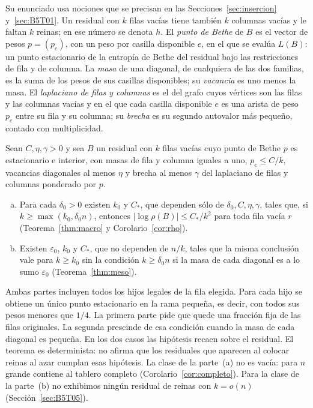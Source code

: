 Su enunciado usa nociones que se precisan en las Secciones~\ref{sec:insercion} y~\ref{sec:B5T01}.
Un residual con $k$ filas vacías tiene también $k$ columnas vacías y le faltan $k$ reinas; en
\cite{Completabilidad} ese número se denota $h$.
El \emph{punto de Bethe} de $B$ es el vector de pesos $p=(p_e)$, con un peso por casilla disponible
$e$, en el que se evalúa $L(B)$: un punto estacionario de la entropía de Bethe del residual bajo las
restricciones de fila y de columna. La \emph{masa} de una diagonal, de cualquiera de las dos
familias, es la suma de los pesos de sus casillas disponibles; su \emph{vacancia} es uno menos la
masa. El \emph{laplaciano de filas y columnas} es el del grafo cuyos vértices son las filas y las
columnas vacías y en el que cada casilla disponible $e$ es una arista de peso $p_e$ entre su fila y
su columna; su \emph{brecha} es su segundo autovalor más pequeño, contado con multiplicidad.

\begin{teorema}\label{thm:intro-consistencia}
Sean $C,\eta,\gamma>0$ y sea $B$ un residual con $k$ filas vacías cuyo punto de Bethe $p$ es
estacionario e interior, con masas de fila y columna iguales a uno, $p_e\le C/k$, vacancias diagonales
al menos $\eta$ y brecha al menos $\gamma$ del laplaciano de filas y columnas ponderado por $p$.
\begin{enumerate}[(a)]
\item Para cada $\delta_0>0$ existen $k_0$ y $C_*$, que dependen sólo de $\delta_0,C,\eta,\gamma$, tales
que, si $k\ge\max(k_0,\delta_0n)$, entonces $|\log\rho(B)|\le C_*/k^2$ para toda fila vacía $r$
(Teorema~\ref{thm:macro} y Corolario~\ref{cor:rho}).
\item Existen $\varepsilon_0$, $k_0$ y $C_*$, que no dependen de $n/k$, tales que la misma conclusión
vale para $k\ge k_0$ sin la condición $k\ge\delta_0n$ si la masa de cada diagonal es a lo sumo
$\varepsilon_0$ (Teorema~\ref{thm:meso}).
\end{enumerate}
\end{teorema}

Ambas partes incluyen todos los hijos legales de la fila elegida. Para cada hijo se obtiene un
único punto estacionario en la rama pequeña, es decir, con todos sus pesos menores que $1/4$. La
primera parte pide que quede una fracción fija de las filas originales. La segunda prescinde de esa
condición cuando la masa de cada diagonal es pequeña. En los dos casos las hipótesis recaen sobre el
residual. El teorema es determinista: no afirma que los residuales que aparecen al colocar reinas al azar
cumplan esas hipótesis.
La clase de la parte~(a) no es vacía: para $n$ grande contiene al tablero completo
(Corolario~\ref{cor:completo}). Para la clase de la parte~(b) no exhibimos ningún residual de reinas
con $k=o(n)$ (Sección~\ref{sec:B5T05}).

